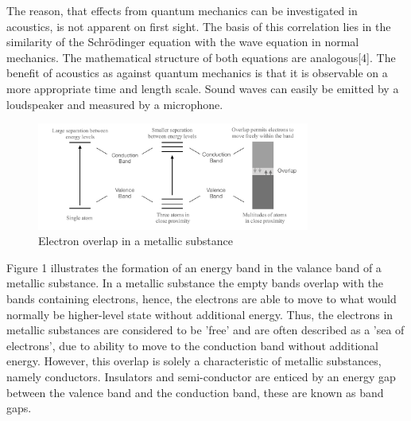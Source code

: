 \documentclass[12pt]{article}
\begin{document}
The reason, that effects from quantum mechanics can be investigated in acoustics, is not apparent on first sight. The basis of this correlation lies in the similarity of the Schrödinger equation with the wave equation in normal mechanics. The mathematical structure of both equations are analogous[4]. The benefit of acoustics as against quantum mechanics is that it is observable on a more appropriate time and length scale. Sound waves can easily be emitted by a loudspeaker and measured by a microphone. 

\begin{figure}[hbt]
	\caption{Electron overlap in a metallic substance}
	\includegraphics[width=0.8\textwidth]{introduction/band_structure}	
\end{figure}
Figure 1 illustrates the formation of an energy band in the valance band of a metallic substance. In a metallic substance the empty bands overlap with the bands containing electrons, hence, the electrons are able to move to what would normally be higher-level state without additional energy. Thus, the electrons in metallic substances are considered to be 'free' and are often described as a 'sea of electrons', due to ability to move to the conduction band without additional energy. However, this overlap is solely a characteristic of metallic substances, namely conductors. Insulators and semi-conductor are enticed by an energy gap between the valence band and the conduction band, these are known as band gaps. 
\end{document}
